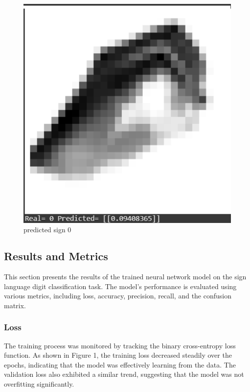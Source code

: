 \documentclass{article}
\begin{document}
\begin{figure}[H]
\begin{minipage}[b]{0.45\textwidth}
        \includegraphics[width=\textwidth]{figures/predictedZero.png}
        \caption{predicted sign 0}
        \label{fig:predictedZero}
    \end{minipage}
\end{figure}


\subsection{Results and Metrics}

This section presents the results of the trained neural network model on the sign language digit classification task. The model's performance is evaluated using various metrics, including loss, accuracy, precision, recall, and the confusion matrix. \\

\subsubsection{Loss}
The training process was monitored by tracking the binary cross-entropy loss function. As shown in Figure 1, the training loss decreased steadily over the epochs, indicating that the model was effectively learning from the data. The validation loss also exhibited a similar trend, suggesting that the model was not overfitting significantly.
\end{document}
